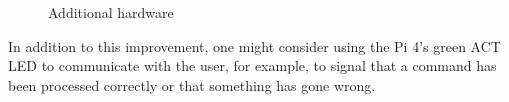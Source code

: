 \documentclass[a4paper, 12pt]{article}
\begin{document}
\begin{figure}[ht]
    \centering
    \caption{Additional hardware}
\end{figure}

In addition to this improvement, one might consider using the Pi 4's green ACT LED to communicate with the user, for example, to signal that a command has been processed correctly or that something has gone wrong.

\printbibliography
\end{document}
